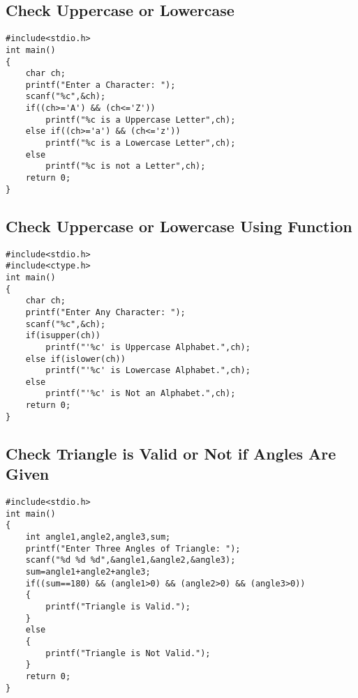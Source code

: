 \documentclass[a4paper,14pt]{article}
\begin{document}
\subsection{Check Uppercase or Lowercase}
\vspace{0.5cm}
\begin{lstlisting}[caption={Check Uppercase or Lowercase}]
#include<stdio.h>
int main()
{
    char ch;
    printf("Enter a Character: ");
    scanf("%c",&ch);
    if((ch>='A') && (ch<='Z'))
        printf("%c is a Uppercase Letter",ch);
    else if((ch>='a') && (ch<='z'))
        printf("%c is a Lowercase Letter",ch);
    else
        printf("%c is not a Letter",ch);
    return 0;
}
\end{lstlisting}
\newpage

\subsection{Check Uppercase or Lowercase Using Function}
\vspace{0.5cm}
\begin{lstlisting}[caption={Check Uppercase or Lowercase Using Function}]
#include<stdio.h>
#include<ctype.h>
int main()
{
    char ch;
    printf("Enter Any Character: ");
    scanf("%c",&ch);
    if(isupper(ch))
        printf("'%c' is Uppercase Alphabet.",ch);
    else if(islower(ch))
        printf("'%c' is Lowercase Alphabet.",ch);
    else
        printf("'%c' is Not an Alphabet.",ch);
    return 0;
}
\end{lstlisting}
\newpage

\subsection{Check Triangle is Valid or Not if Angles Are Given}
\vspace{0.5cm}
\begin{lstlisting}[caption={Check Triangle is Valid or Not if Angles Are Given}]
#include<stdio.h>
int main()
{
    int angle1,angle2,angle3,sum;
    printf("Enter Three Angles of Triangle: ");
    scanf("%d %d %d",&angle1,&angle2,&angle3);
    sum=angle1+angle2+angle3;
    if((sum==180) && (angle1>0) && (angle2>0) && (angle3>0))
    {
        printf("Triangle is Valid.");
    }
    else
    {
        printf("Triangle is Not Valid.");
    }
    return 0;
}
\end{lstlisting}
\newpage
\end{document}
